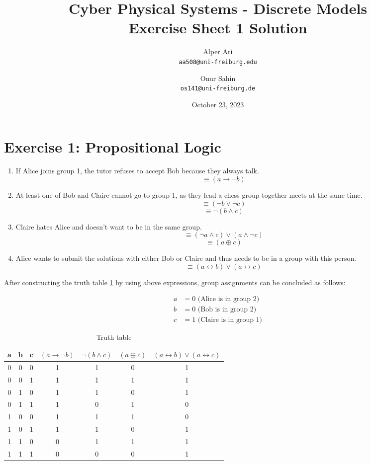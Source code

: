 \documentclass{article}
\title{
Cyber Physical Systems - Discrete Models \\
[0.2em]Exercise Sheet 1 Solution
}
\author{
  Alper Ari\\
  \texttt{aa508@uni-freiburg.edu}
  \and
  Onur Sahin\\
  \texttt{os141@uni-freiburg.de}
}
\date{October 23, 2023}
\begin{document}
\maketitle
\section*{Exercise 1: Propositional Logic}

\begin{enumerate}[(1)]
    \item {If Alice joins group 1, the tutor refuses to accept Bob because they always talk.}
    $$ \equiv (a \rightarrow \neg b) $$
    
    \item {At least one of Bob and Claire cannot go to group 1, as they lead a chess group together meets at the same time.}
    $$ \equiv (\neg b \vee \neg c) $$
    $$ \equiv \neg(b \wedge c) $$
    
    \item {Claire hates Alice and doesn’t want to be in the same group.}
    $$ \equiv (\neg a \wedge c) \vee (a \wedge \neg c) $$
    $$ \equiv (a \oplus c) $$
    
    \item {Alice wants to submit the solutions with either Bob or Claire and thus needs to be in a group with this person.}
    $$ \equiv (a \leftrightarrow b) \vee (a \leftrightarrow c) $$
\end{enumerate}

After constructing the truth table \ref{tab:truth-table} by using above expressions, group assignments can be concluded as follows:

\begin{equation} 
    \begin{split}
        a &= 0 \text{ (Alice is in group 2)} \\
        b &= 0 \text{ (Bob is in group 2)} \\
        c &= 1 \text{ (Claire is in group 1)}
    \end{split}
\end{equation}

\begin{table}
\centering
\begin{tabular}{c|c|c|c|c|c|c}
a & b & c &  $(a \rightarrow \neg b)$ & $\neg(b \wedge c)$ & $(a \oplus c)$ & $(a \leftrightarrow b) \vee (a \leftrightarrow c)$
\\\hline
0 & 0 & 0 & 1 & 1 & 0 & 1 \\
\rowcolor{gray!20} 0 & 0 & 1 & 1 & 1 & 1 & 1 \\
0 & 1 & 0 & 1 & 1 & 0 & 1 \\
0 & 1 & 1 & 1 & 0 & 1 & 0 \\
1 & 0 & 0 & 1 & 1 & 1 & 0 \\
1 & 0 & 1 & 1 & 1 & 0 & 1 \\
1 & 1 & 0 & 0 & 1 & 1 & 1 \\
1 & 1 & 1 & 0 & 0 & 0 & 1 \\
\end{tabular}
\caption{\label{tab:truth-table}Truth table}
\end{table}
\end{document}
